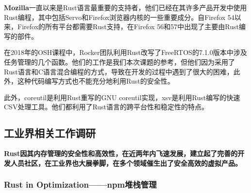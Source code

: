 \documentclass[12pt, a4paper]{article}
\begin{document}
	\textbf{Mozilla}一直以来是Rust语言最重要的支持者，他们已经在其许多产品开发中使用Rust编程，其中包括Servo和Firefox浏览器内核的一些重要成分。自Firefox 54以来，Firefox的所有平台都需要Rust支持，在Firefox 56和57中出现了主要由Rust编写的部件。
	
	在2018年的OSH课程中，Rocker团队利用Rust改写了FreeRTOS的7.1.0版本中涉及任务管理的几个函数。他们的工作是我们本次课题的参考，但他们因为采用了Rust语言和C语言混合编程的方式，导致在开发的过程中遇到了很大的困难，此外，这种代码编写方式也不能充分地利用Rust的安全性。
	
	此外，coreutil是利用Rust重写的GNU coreutil实现，xsv是利用Rust编写的快速CSV处理工具。他们都利用了Rust语言的跨平台性和稳定性的特点。
	\subsection{工业界相关工作调研}
	\textbf{Rust因其内存管理的安全性和高效性，在近两年内飞速发展，建立起了完善的开发人员社区，在工业界也大展拳脚，在多个领域催生出了安全高效的虚拟产品。}
	\subsubsection{Rust in Optimization——npm堆栈管理}
		
\end{document}
